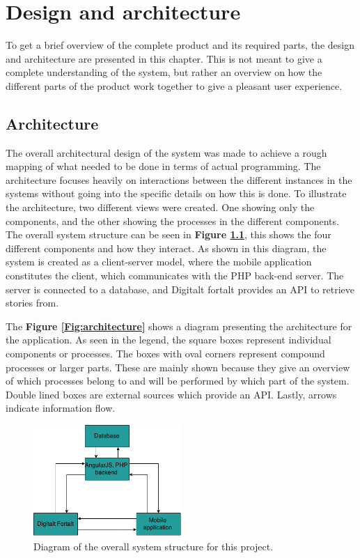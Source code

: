 
\chapter{Design and architecture}

To get a brief overview of the complete product and its required parts, the design and architecture are presented in this chapter. This is not meant to give a complete understanding of the system, but rather an overview on how the different parts of the product work together to give a pleasant user experience.

\section{Architecture}

The overall architectural design of the system was made to achieve a rough mapping of what needed to be done in terms of actual programming. The architecture focuses heavily on interactions between the different instances in the systems without going into the specific details on how this is done. To illustrate the architecture, two different views were created. One showing only the components, and the other showing the processes in the different components. The overall system structure can be seen in \textbf{Figure \ref{Fig:system_structure}}, this shows the four different components and how they interact. As shown in this diagram, the system is created as a client-server model, where the mobile application constitutes the client, which communicates with the PHP back-end server. The server is connected to a database, and Digitalt fortalt provides an API to retrieve stories from.\newline

The \textbf{Figure \ref{Fig:architecture}} shows a diagram presenting the architecture for the application. As seen in the legend, the square boxes represent individual components or processes. The boxes with oval corners represent compound processes or larger parts. These are mainly shown because they give an overview of which processes belong to and will be performed by which part of the system. Double lined boxes are external sources which provide an API. Lastly, arrows indicate information flow.

\begin{figure}[h!]
	\centering
	\includegraphics[width=0.5\textwidth]{fig/system_structure}
	\caption{Diagram of the overall system structure for this project.}
	\label{Fig:system_structure}
\end{figure}

